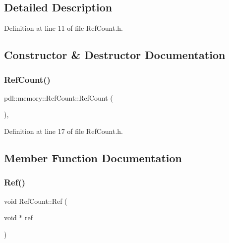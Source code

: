 \subsection{Detailed Description}


Definition at line 11 of file Ref\+Count.\+h.



\subsection{Constructor \& Destructor Documentation}
\mbox{\label{classpdl_1_1memory_1_1_ref_count_a13c9f5d75a77a5cfd2b3a2ed5a150b14}} 
\subsubsection{\texorpdfstring{RefCount()}{RefCount()}}
{\footnotesize\ttfamily pdl\+::memory\+::\+Ref\+Count\+::\+Ref\+Count (\begin{DoxyParamCaption}{ }\end{DoxyParamCaption})\hspace{0.3cm}{\ttfamily [inline]}, {\ttfamily [private]}}



Definition at line 17 of file Ref\+Count.\+h.


\begin{DoxyCode}{0}

\end{DoxyCode}


\subsection{Member Function Documentation}
\mbox{\label{classpdl_1_1memory_1_1_ref_count_abffc81485714db7707b9ce5efed24e03}} 
\subsubsection{\texorpdfstring{Ref()}{Ref()}}
{\footnotesize\ttfamily void Ref\+Count\+::\+Ref (\begin{DoxyParamCaption}\item[{void $\ast$}]{ref }\end{DoxyParamCaption})\hspace{0.3cm}{\ttfamily [static]}}



